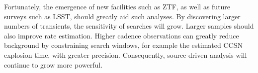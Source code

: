 \documentclass[]{article}
\begin{document}
	Fortunately, the emergence of new facilities such as ZTF, as well as future surveys such as LSST, should greatly aid such analyses. By discovering larger numbers of transients, the sensitivity of searches will grow. Larger samples should also improve rate estimation. Higher cadence observations can greatly reduce background by constraining search windows, for example the estimated CCSN explosion time, with greater precision. Consequently, source-driven analysis will continue to grow more powerful.
	
	
\end{document}
